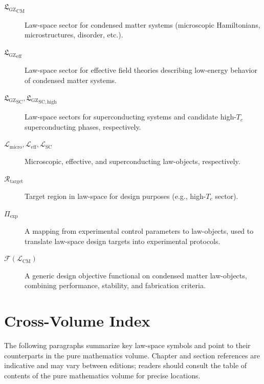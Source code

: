\documentclass[11pt]{book}
\newcommand{\GZLS}{\ensuremath{\mathfrak{L}_{\mathrm{GZ}}}}
\theoremstyle{plain}
\theoremstyle{definition}
\theoremstyle{remark}
\begin{document}
\begin{description}
  \item[${\GZLS}_{\mathrm{CM}}$]
    Law-space sector for condensed matter systems (microscopic
    Hamiltonians, microstructures, disorder, etc.).
  \item[${\GZLS}_{\mathrm{eff}}$]
    Law-space sector for effective field theories describing
    low-energy behavior of condensed matter systems.
  \item[${\GZLS}_{\mathrm{SC}},{\GZLS}_{\mathrm{SC,high}}$]
    Law-space sectors for superconducting systems and candidate
    high-$T_c$ superconducting phases, respectively.
  \item[$\mathcal{L}_{\mathrm{micro}},
         \mathcal{L}_{\mathrm{eff}},
         \mathcal{L}_{\mathrm{SC}}$]
    Microscopic, effective, and superconducting law-objects,
    respectively.
  \item[$\mathcal{R}_{\mathrm{target}}$]
    Target region in law-space for design purposes (e.g.,
    high-$T_c$ sector).
  \item[$\Pi_{\mathrm{exp}}$]
    A mapping from experimental control parameters to law-objects,
    used to translate law-space design targets into experimental
    protocols.
  \item[$\mathcal{F}(\mathcal{L}_{\mathrm{CM}})$]
    A generic design objective functional on condensed matter
    law-objects, combining performance, stability, and fabrication
    criteria.
\end{description}

\section*{Cross-Volume Index}


The following paragraphs summarize key law-space symbols and point to
their counterparts in the pure mathematics volume\cite{GaoZheng2025GFramework}.
Chapter and section references are indicative and may vary between
editions; readers should consult the table of contents of the pure
mathematics volume for precise locations.
\end{document}
